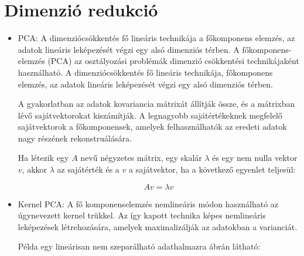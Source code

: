 \section{Dimenzió redukció}
\begin{itemize}
\item PCA: A dimenziócsökkentés fő lineáris technikája a főkomponens elemzés, az adatok lineáris leképezését végzi egy alsó dimenziós térben. A főkomponens-elemzés (PCA) az osztályozási problémák dimenzió csökkentési technikájaként használható. A dimenziócsökkentés fő lineáris technikája, főkomponens elemzés, az adatok lineáris leképezését végzi egy alsó dimenziós térben.

A gyakorlatban az adatok kovariancia mátrixát állítják össze, és a mátrixban lévő sajátvektorokat kiszámítják. A legnagyobb sajátértékeknek megfelelő sajátvektorok a főkomponensek, amelyek felhasználhatók az eredeti adatok nagy részének rekonstruálására.

Ha létezik egy $A$ nevű négyzetes mátrix, egy skalár $\lambda$ és egy nem nulla vektor $v$, akkor $\lambda$ az sajátérték és a $v$ a sajátvektor, ha a következő egyenlet teljesül:

$$
Av = \lambda v
$$

\item Kernel PCA: A fő komponenselemzés nemlineáris módon használható az úgynevezett kernel trükkel. Az így kapott technika képes nemlineáris leképezések létrehozására, amelyek maximalizálják az adatokban a varianciát.

Példa egy lineárisan nem szeparálható adathalmazra  ábrán látható:


\end{itemize}
